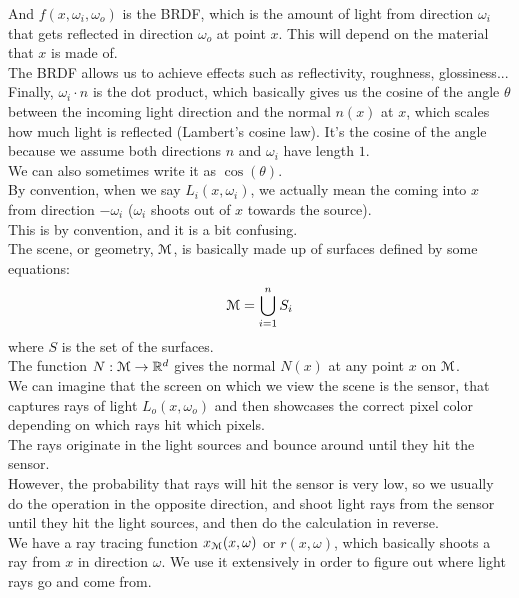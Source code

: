 \documentclass[12pt]{article}
\begin{document}
And $f(x, \omega_i, \omega_o)$ is the BRDF, 
which is the amount of light from direction $\omega_i$
that gets reflected in direction $\omega_o$
at point $x$.
This will depend on the material that $x$ is made of. \\
The BRDF allows us to achieve effects such as reflectivity,
roughness, glossiness... \\ 

Finally, $\omega_i \cdot n$ is the dot product,
which basically gives us the cosine of the angle $\theta$
between the incoming light direction and the normal
$n(x)$ at $x$, which scales how much light is reflected
(Lambert's cosine law).
It's the cosine of the angle because we 
assume both directions $n$ and $\omega_i$
have length $1$. \\
We can also sometimes write it as $\cos(\theta)$. \\

By convention, when we say $L_i(x, \omega_i)$,
we actually mean the coming into $x$
from direction $-\omega_i$
($\omega_i$ shoots out of $x$ towards the source). \\
This is by convention, and it is a bit confusing. \\

The scene, or geometry,
$\mathcal{M}$, is basically made up of surfaces defined
by some equations:
\[ \mathcal{M} = \bigcup_{i=1}^{n} S_i \]
where $S$ is the set of the surfaces. \\

The function $N:\mathcal{M} \to \mathbb{R}^d$
gives the normal $N(x)$ at any point $x$ on $\mathcal{M}$. \\

We can imagine that the screen on which we view the
scene is the sensor, that captures rays of light 
$L_o(x, \omega_o)$ and then showcases the correct pixel
color depending on which rays hit which pixels. \\
The rays originate in the light sources and bounce around
until they hit the sensor. \\
However, the probability that rays will hit the sensor
is very low, so we usually do the operation in the
opposite direction, and shoot light rays from the sensor
until they hit the light sources,
and then do the calculation in reverse. \\

We have a ray tracing function $x_{\mathcal{M}}(x, \omega)$
or $r(x, \omega)$, which basically shoots a ray
from $x$ in direction $\omega$. We use it extensively
in order to figure out where light rays go and come from. \\
\end{document}
